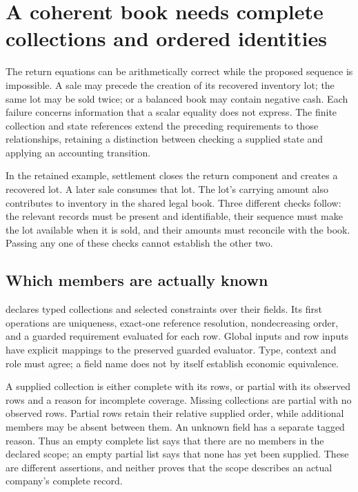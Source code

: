 \section{A coherent book needs complete collections and ordered identities}
\label{sec:collection-state-requirements}

The return equations can be arithmetically correct while the proposed sequence
is impossible. A sale may precede the creation of its recovered inventory lot;
the same lot may be sold twice; or a balanced book may contain negative cash.
Each failure concerns information that a scalar equality does not express. The
finite collection and state references extend the preceding requirements to
those relationships, retaining a distinction between checking a supplied state
and applying an accounting transition.

In the retained example, settlement closes the return component and creates a
recovered lot. A later sale consumes that lot. The lot's carrying amount also
contributes to inventory in the shared legal book. Three different checks follow:
the relevant records must be present and identifiable, their sequence must make
the lot available when it is sold, and their amounts must reconcile with the
book. Passing any one of these checks cannot establish the other two.

\subsection{Which members are actually known}

 declares typed collections and selected constraints
over their fields. Its first operations are uniqueness, exact-one reference
resolution, nondecreasing order, and a guarded requirement evaluated for each
row. Global inputs and row inputs have explicit mappings to the preserved
guarded evaluator. Type, context and role must agree; a field name does not
by itself establish economic equivalence.

A supplied collection is either complete with its rows, or partial with its
observed rows and a reason for incomplete coverage. Missing collections are
partial with no observed rows. Partial rows retain their relative supplied
order, while additional members may be absent between them. An unknown field
has a separate tagged reason. Thus an empty complete list says that there are
no members in the declared scope; an empty partial list says that none has yet
been supplied. These are different assertions, and neither proves that the
scope describes an actual company's complete record.


